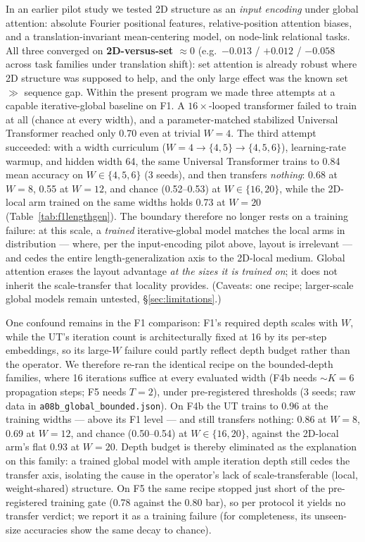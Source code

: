 \documentclass[11pt]{article}
\begin{document}
In an earlier pilot study we tested 2D structure as an \emph{input
encoding} under global attention: absolute Fourier positional features,
relative-position attention biases, and a translation-invariant
mean-centering model, on node-link relational tasks. All three converged on
\textbf{2D-versus-set $\approx 0$} (e.g.\ $-0.013$ / $+0.012$ / $-0.058$
across task families under translation shift): set attention is already
robust where 2D structure was supposed to help, and the only large effect was
the known set $\gg$ sequence gap. Within the present program we made three attempts at a capable
iterative-global baseline on F1. A $16\times$-looped transformer failed to
train at all (chance at every width), and a parameter-matched stabilized
Universal Transformer reached only 0.70 even at trivial $W = 4$. The third
attempt succeeded: with a width curriculum ($W = 4 \to \{4,5\} \to
\{4,5,6\}$), learning-rate warmup, and hidden width 64, the same Universal
Transformer trains to 0.84 mean accuracy on $W \in \{4,5,6\}$ (3 seeds), and
then transfers \emph{nothing}: 0.68 at $W = 8$, 0.55 at $W = 12$, and
chance (0.52--0.53) at $W \in \{16, 20\}$, while the 2D-local arm trained on
the same widths holds 0.73 at $W = 20$
(Table~\ref{tab:f1lengthgen}). The boundary therefore no longer rests on a
training failure: at this scale, a \emph{trained} iterative-global model
matches the local arms in distribution --- where, per the input-encoding
pilot above, layout is irrelevant --- and cedes the entire length-generalization axis to
the 2D-local medium. Global attention erases the layout advantage \emph{at
the sizes it is trained on}; it does not inherit the scale-transfer that
locality provides. (Caveats: one recipe; larger-scale
global models remain untested, \S\ref{sec:limitations}.)

One confound remains in the F1 comparison: F1's required depth scales with
$W$, while the UT's iteration count is architecturally fixed at 16 by its
per-step embeddings, so its large-$W$ failure could partly reflect depth
budget rather than the operator. We therefore re-ran the identical recipe on
the bounded-depth families, where 16 iterations suffice at every evaluated
width (F4b needs $\sim K = 6$ propagation steps; F5 needs $T = 2$), under
pre-registered thresholds (3 seeds; raw data in
\texttt{a08b\_global\_bounded.json}). On F4b the UT trains to 0.96 at the
training widths --- above its F1 level --- and still transfers nothing:
0.86 at $W = 8$, 0.69 at $W = 12$, and chance (0.50--0.54) at
$W \in \{16, 20\}$, against the 2D-local arm's flat 0.93 at $W = 20$. Depth
budget is thereby eliminated as the explanation on this family: a trained
global model with ample iteration depth still cedes the transfer axis,
isolating the cause in the operator's lack of scale-transferable (local,
weight-shared) structure. On F5 the same recipe stopped just short of the
pre-registered training gate (0.78 against the 0.80 bar), so per protocol it
yields no transfer verdict; we report it as a training failure (for
completeness, its unseen-size accuracies show the same decay to chance).
\end{document}
